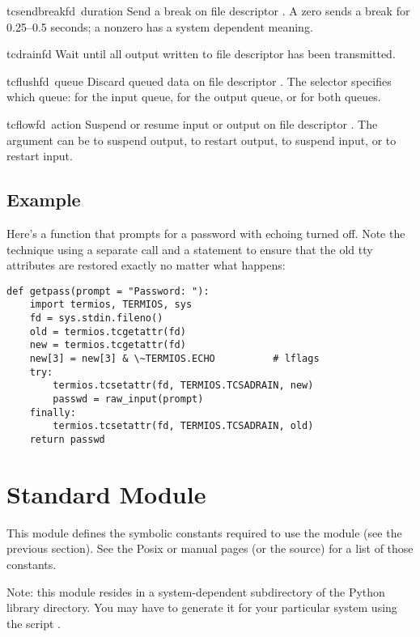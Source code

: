 \begin{funcdesc}{tcsendbreak}{fd\, duration}
Send a break on file descriptor .  A zero  sends
a break for 0.25--0.5 seconds; a nonzero  has a system
dependent meaning.
\end{funcdesc}

\begin{funcdesc}{tcdrain}{fd}
Wait until all output written to file descriptor  has been
transmitted.
\end{funcdesc}

\begin{funcdesc}{tcflush}{fd\, queue}
Discard queued data on file descriptor .  The 
selector specifies which queue:  for the input
queue,  for the output queue, or
 for both queues.
\end{funcdesc}

\begin{funcdesc}{tcflow}{fd\, action}
Suspend or resume input or output on file descriptor .  The
 argument can be  to suspend output,
 to restart output,  to
suspend input, or  to restart input.
\end{funcdesc}

\subsection{Example}

Here's a function that prompts for a password with echoing turned off.
Note the technique using a separate  call
and a  statement to ensure that the old tty
attributes are restored exactly no matter what happens:

\bcode\begin{verbatim}
def getpass(prompt = "Password: "):
    import termios, TERMIOS, sys
    fd = sys.stdin.fileno()
    old = termios.tcgetattr(fd)
    new = termios.tcgetattr(fd)
    new[3] = new[3] & \~TERMIOS.ECHO          # lflags
    try:
        termios.tcsetattr(fd, TERMIOS.TCSADRAIN, new)
        passwd = raw_input(prompt)
    finally:
        termios.tcsetattr(fd, TERMIOS.TCSADRAIN, old)
    return passwd
\end{verbatim}\ecode
%
\section{Standard Module }

\renewcommand{\indexsubitem}{(in module TERMIOS)}

This module defines the symbolic constants required to use the
 module (see the previous section).  See the Posix or
\UNIX{} manual pages (or the source) for a list of those constants.

Note: this module resides in a system-dependent subdirectory of the
Python library directory.  You may have to generate it for your
particular system using the script .
